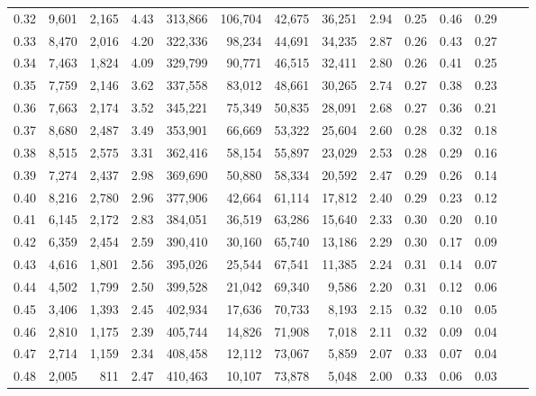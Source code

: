 \begin{tabular}{rrrrrrrrrrrrrr}
0.32 &   9,601 &  2,165 &    4.43 &  313,866 &  106,704 &  42,675 &  36,251 &  2.94 &  0.25 &  0.46 &      0.29 \\
0.33 &   8,470 &  2,016 &    4.20 &  322,336 &   98,234 &  44,691 &  34,235 &  2.87 &  0.26 &  0.43 &      0.27 \\
0.34 &   7,463 &  1,824 &    4.09 &  329,799 &   90,771 &  46,515 &  32,411 &  2.80 &  0.26 &  0.41 &      0.25 \\
0.35 &   7,759 &  2,146 &    3.62 &  337,558 &   83,012 &  48,661 &  30,265 &  2.74 &  0.27 &  0.38 &      0.23 \\
0.36 &   7,663 &  2,174 &    3.52 &  345,221 &   75,349 &  50,835 &  28,091 &  2.68 &  0.27 &  0.36 &      0.21 \\
0.37 &   8,680 &  2,487 &    3.49 &  353,901 &   66,669 &  53,322 &  25,604 &  2.60 &  0.28 &  0.32 &      0.18 \\
0.38 &   8,515 &  2,575 &    3.31 &  362,416 &   58,154 &  55,897 &  23,029 &  2.53 &  0.28 &  0.29 &      0.16 \\
0.39 &   7,274 &  2,437 &    2.98 &  369,690 &   50,880 &  58,334 &  20,592 &  2.47 &  0.29 &  0.26 &      0.14 \\
0.40 &   8,216 &  2,780 &    2.96 &  377,906 &   42,664 &  61,114 &  17,812 &  2.40 &  0.29 &  0.23 &      0.12 \\
0.41 &   6,145 &  2,172 &    2.83 &  384,051 &   36,519 &  63,286 &  15,640 &  2.33 &  0.30 &  0.20 &      0.10 \\
0.42 &   6,359 &  2,454 &    2.59 &  390,410 &   30,160 &  65,740 &  13,186 &  2.29 &  0.30 &  0.17 &      0.09 \\
0.43 &   4,616 &  1,801 &    2.56 &  395,026 &   25,544 &  67,541 &  11,385 &  2.24 &  0.31 &  0.14 &      0.07 \\
0.44 &   4,502 &  1,799 &    2.50 &  399,528 &   21,042 &  69,340 &   9,586 &  2.20 &  0.31 &  0.12 &      0.06 \\
0.45 &   3,406 &  1,393 &    2.45 &  402,934 &   17,636 &  70,733 &   8,193 &  2.15 &  0.32 &  0.10 &      0.05 \\
0.46 &   2,810 &  1,175 &    2.39 &  405,744 &   14,826 &  71,908 &   7,018 &  2.11 &  0.32 &  0.09 &      0.04 \\
0.47 &   2,714 &  1,159 &    2.34 &  408,458 &   12,112 &  73,067 &   5,859 &  2.07 &  0.33 &  0.07 &      0.04 \\
0.48 &   2,005 &    811 &    2.47 &  410,463 &   10,107 &  73,878 &   5,048 &  2.00 &  0.33 &  0.06 &      0.03 \\

\end{tabular}
